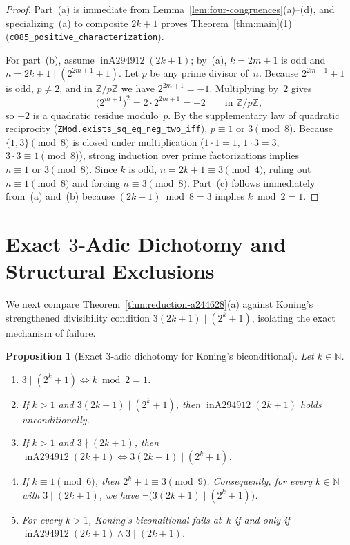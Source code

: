 \documentclass[11pt]{article}
\newtheorem{proposition}[theorem]{Proposition}
\theoremstyle{definition}
\newcommand{\N}{\mathbb{N}}
\newcommand{\Z}{\mathbb{Z}}
\newcommand{\inA}{\operatorname{inA294912}}
\begin{document}
\begin{proof}
Part~(a) is immediate from Lemma~\ref{lem:four-congruences}(a)--(d), and specializing~(a) to composite $2k+1$ proves Theorem~\ref{thm:main}(1) (\texttt{c085\_positive\_characterization}).

For part~(b), assume $\inA(2k + 1)$; by~(a), $k = 2m + 1$ is odd and $n = 2k + 1 \mid (2^{2m+1} + 1)$. Let $p$ be any prime divisor of~$n$. Because $2^{2m+1} + 1$ is odd, $p \ne 2$, and in $\Z/p\Z$ we have $2^{2m+1} = -1$. Multiplying by~$2$ gives
\[
\bigl(2^{m+1}\bigr)^2 = 2 \cdot 2^{2m+1} = -2 \qquad \text{in }\Z/p\Z,
\]
so $-2$ is a quadratic residue modulo~$p$. By the supplementary law of quadratic reciprocity (\texttt{ZMod.exists\_sq\_eq\_neg\_two\_iff}), $p \equiv 1 \text{ or } 3 \pmod 8$. Because $\{1, 3\} \pmod 8$ is closed under multiplication ($1 \cdot 1 = 1$, $1 \cdot 3 = 3$, $3 \cdot 3 \equiv 1 \pmod 8$), strong induction over prime factorizations implies $n \equiv 1 \text{ or } 3 \pmod 8$. Since $k$ is odd, $n = 2k + 1 \equiv 3 \pmod 4$, ruling out $n \equiv 1 \pmod 8$ and forcing $n \equiv 3 \pmod 8$. Part~(c) follows immediately from~(a) and~(b) because $(2k+1) \bmod 8 = 3$ implies $k \bmod 2 = 1$.
\end{proof}

\section{Exact \texorpdfstring{$3$}{3}-Adic Dichotomy and Structural Exclusions}
\label{sec:dichotomy}

We next compare Theorem~\ref{thm:reduction-a244628}(a) against Koning's strengthened divisibility condition $3(2k + 1) \mid (2^k + 1)$, isolating the exact mechanism of failure.

\begin{proposition}[Exact $3$-adic dichotomy for Koning's biconditional]
\label{prop:dichotomy}
Let $k \in \N$.
\begin{enumerate}
\item[\textup{(a)}] $3 \mid (2^k + 1) \iff k \bmod 2 = 1$.
\item[\textup{(b)}] If $k > 1$ and $3(2k + 1) \mid (2^k + 1)$, then $\inA(2k + 1)$ holds unconditionally.
\item[\textup{(c)}] If $k > 1$ and $3 \nmid (2k + 1)$, then $\inA(2k + 1) \iff 3(2k + 1) \mid (2^k + 1)$.
\item[\textup{(d)}] If $k \equiv 1 \pmod 6$, then $2^k + 1 \equiv 3 \pmod 9$. Consequently, for every $k \in \N$ with $3 \mid (2k + 1)$, we have $\neg\bigl(3(2k + 1) \mid (2^k + 1)\bigr)$.
\item[\textup{(e)}] For every $k > 1$, Koning's biconditional fails at~$k$ if and only if $\inA(2k + 1) \land 3 \mid (2k + 1)$.
\end{enumerate}
\end{proposition}
\end{document}
